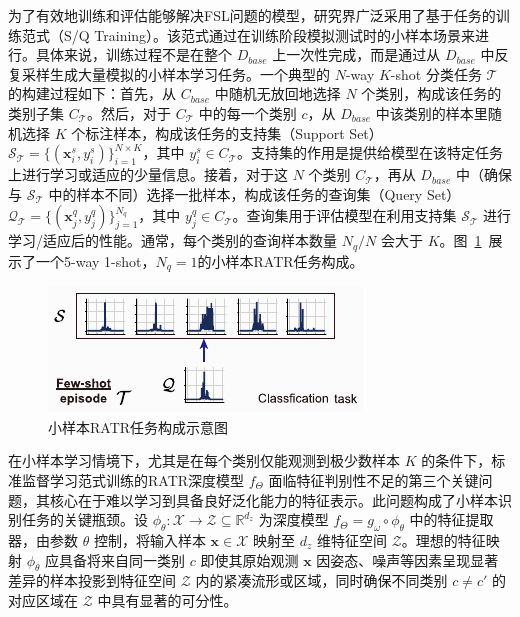 为了有效地训练和评估能够解决FSL问题的模型，研究界广泛采用了基于任务的训练范式（S/Q Training）。该范式通过在训练阶段模拟测试时的小样本场景来进行。具体来说，训练过程不是在整个 $D_{base}$ 上一次性完成，而是通过从 $D_{base}$ 中反复采样生成大量模拟的小样本学习任务。一个典型的 $N$-way $K$-shot 分类任务 $\mathcal{T}$ 的构建过程如下：首先，从 $C_{base}$ 中随机无放回地选择 $N$ 个类别，构成该任务的类别子集 $C_{\mathcal{T}}$。然后，对于 $C_{\mathcal{T}}$ 中的每一个类别 $c$，从 $D_{base}$ 中该类别的样本里随机选择 $K$ 个标注样本，构成该任务的支持集（Support Set） $\mathcal{S}_{\mathcal{T}} = \{(\mathbf{x}_i^s, y_i^s)\}_{i=1}^{N \times K}$，其中 $y_i^s \in C_{\mathcal{T}}$。支持集的作用是提供给模型在该特定任务上进行学习或适应的少量信息。接着，对于这 $N$ 个类别 $C_{\mathcal{T}}$，再从 $D_{base}$ 中（确保与 $\mathcal{S}_{\mathcal{T}}$ 中的样本不同）选择一批样本，构成该任务的查询集（Query Set） $\mathcal{Q}_{\mathcal{T}} = \{(\mathbf{x}_j^q, y_j^q)\}_{j=1}^{N_q}$，其中 $y_j^q \in C_{\mathcal{T}}$。查询集用于评估模型在利用支持集 $\mathcal{S}_{\mathcal{T}}$ 进行学习/适应后的性能。通常，每个类别的查询样本数量 $N_q/N$ 会大于 $K$。图~\ref{fig:fs}~展示了一个5-way 1-shot，$N_q=1$的小样本RATR任务构成。

\begin{figure}[h]
    \centering
    \includegraphics[width=0.50\linewidth]{figures/FS.pdf}
    \caption{小样本RATR任务构成示意图}
    \label{fig:fs}
\end{figure}

在小样本学习情境下，尤其是在每个类别仅能观测到极少数样本 $K$ 的条件下，标准监督学习范式训练的RATR深度模型 $f_\Theta$ 面临特征判别性不足的第三个关键问题，其核心在于难以学习到具备良好泛化能力的特征表示。此问题构成了小样本识别任务的关键瓶颈。设 $\phi_\theta: \mathcal{X} \rightarrow \mathcal{Z} \subseteq \mathbb{R}^{d_z}$ 为深度模型 $f_\Theta = g_\omega \circ \phi_\theta$ 中的特征提取器，由参数 $\theta$ 控制，将输入样本 $\mathbf{x} \in \mathcal{X}$ 映射至 $d_z$ 维特征空间 $\mathcal{Z}$。理想的特征映射 $\phi_\theta$ 应具备将来自同一类别 $c$ 即使其原始观测 $\mathbf{x}$ 因姿态、噪声等因素呈现显著差异的样本投影到特征空间 $\mathcal{Z}$ 内的紧凑流形或区域，同时确保不同类别 $c \neq c'$ 的对应区域在 $\mathcal{Z}$ 中具有显著的可分性。

